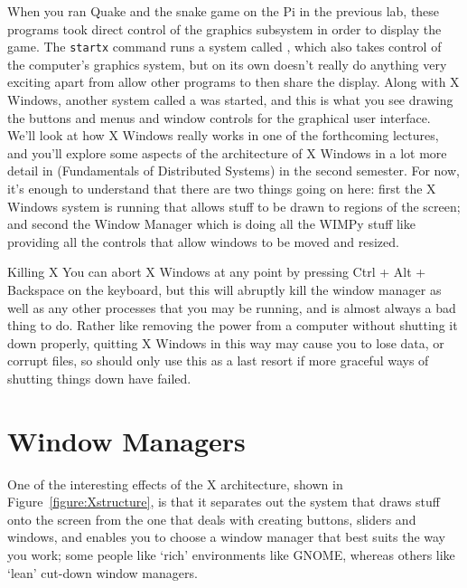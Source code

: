 When you ran Quake and the snake game on the Pi in the previous lab, these programs took direct control of the graphics subsystem in order to display the game. The \texttt{startx} command runs a system called , which also takes control of the computer's graphics system, but on its own doesn't really do anything very exciting apart from allow other programs to then share the display. Along with X Windows, another system called a  was started, and this is what you see drawing the buttons and menus and window controls for the graphical user interface. We'll look at how X Windows really works in one of the forthcoming  lectures, and you'll explore some aspects of the architecture of X Windows in a lot more detail in  (Fundamentals of Distributed Systems) in the second semester. For now, it's enough to understand that there are two things going on here: first the X Windows system is running that allows stuff to be drawn to regions of the screen; and second the Window Manager which is doing all the WIMPy stuff like providing all the controls that allow windows to be moved and resized.

\begin{danger}{Killing X}
You can abort X Windows at any point by pressing Ctrl + Alt + Backspace on the keyboard, but this will abruptly kill the window manager as well as any other processes that you may be running, and is almost always a bad thing to do. Rather like removing the power from a computer without shutting it down properly, quitting X Windows in this way may cause you to lose data, or corrupt files, so should only use this as a last resort if more graceful ways of shutting things down have failed.
\end{danger}

\section{Window Managers} 
One of the interesting effects of the X architecture, shown in Figure~\ref{figure:Xstructure}, is that it separates out the system that draws stuff onto the screen from the one that deals with creating buttons, sliders and windows, and enables you to choose a window manager that best suits the way you work; some people like `rich' environments like GNOME, whereas others like `lean' cut-down window managers. 

